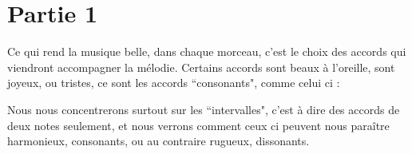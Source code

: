 \documentclass[a4paper, 12pt, fleqn]{report}
\begin{document}
\section{Partie 1}

Ce qui rend la musique belle, dans chaque morceau, c'est le choix des accords qui viendront accompagner la mélodie. Certains accords sont beaux à l’oreille, sont joyeux, ou tristes, ce sont les accords ``consonants", comme celui ci :


Nous nous concentrerons surtout sur les ``intervalles", c’est à dire des accords de deux notes seulement, et nous verrons comment ceux ci peuvent nous paraître harmonieux, consonants, ou au contraire rugueux, dissonants.
\end{document}
